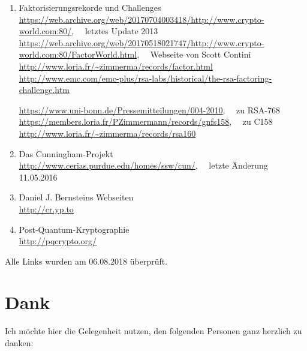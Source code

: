 \begin{refsegment}
\begin{enumerate}
   \item Faktorisierungsrekorde und Challenges
	 \\
         \url{https://web.archive.org/web/20170704003418/http://www.crypto-world.com:80/},~~ letztes Update 2013\\
         \url{https://web.archive.org/web/20170518021747/http://www.crypto-world.com:80/FactorWorld.html},~~ Webseite von Scott Contini\\
         \url{http://www.loria.fr/~zimmerma/records/factor.html}\\
	 \url{http://www.emc.com/emc-plus/rsa-labs/historical/the-rsa-factoring-challenge.htm}

         \url{https://www.uni-bonn.de/Pressemitteilungen/004-2010},~~ zu RSA-768\\
         \url{https://members.loria.fr/PZimmermann/records/gnfs158},~~ zu C158\\
         \url{http://www.loria.fr/~zimmerma/records/rsa160}

	

   \item Das Cunningham-Projekt\\
         \url{http://www.cerias.purdue.edu/homes/ssw/cun/},~~ letzte Änderung 11.05.2016

   \item Daniel J. Bernsteins Webseiten\\
	 \url{http://cr.yp.to}

   \item Post-Quantum-Kryptographie\\
	 \url{http://pqcrypto.org/}

\end{enumerate}

 Alle Links wurden am 06.08.2018 überprüft.



\section*{Dank} 
Ich möchte hier die Gelegenheit nutzen, den folgenden Personen ganz
herzlich zu danken:
\begin{itemize}


\end{itemize}
\end{refsegment}
